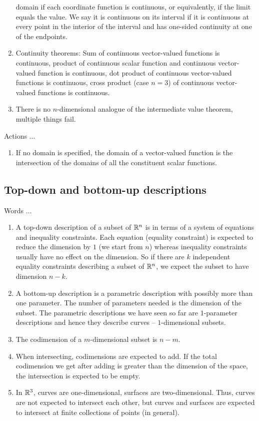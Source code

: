 \documentclass[10pt]{amsart}
\begin{document}
\begin{enumerate}
  domain if each coordinate function is continuous, or equivalently,
  if the limit equals the value. We say it is continuous on its
  interval if it is continuous at every point in the interior of the
  interval and has one-sided continuity at one of the endpoints.
\item Continuity theorems: Sum of continuous vector-valued functions
  is continuous, product of continuous scalar function and continuous
  vector-valued function is continuous, dot product of continuous
  vector-valued functions is continuous, cross product (case $n = 3$)
  of continuous vector-valued functions is continuous.
\item There is no $n$-dimensional analogue of the intermediate value
  theorem, multiple things fail.
\end{enumerate}

Actions ...

\begin{enumerate}
\item If no domain is specified, the domain of a vector-valued
  function is the intersection of the domains of all the constituent
  scalar functions.
\end{enumerate}

\subsection{Top-down and bottom-up descriptions}

Words ...

\begin{enumerate}
\item A top-down description of a subset of $\mathbb{R}^n$ is in terms of a
  system of equations and inequality constraints. Each equation
  (equality constraint) is expected to reduce the dimension by $1$ (we
  start from $n$) whereas inequality constraints usually have no
  effect on the dimension. So if there are $k$ independent equality
  constraints describing a subset of $\mathbb{R}^n$, we expect the subset to
  have dimension $n - k$.
\item A bottom-up description is a parametric description with
  possibly more than one parameter. The number of parameters needed is
  the dimension of the subset. The parametric descriptions we have
  seen so far are $1$-parameter descriptions and hence they describe
  curves -- $1$-dimensional subsets.
\item The codimension of a $m$-dimensional subset is $n - m$.
\item When intersecting, codimensions are expected to add. If the
  total codimension we get after adding is greater than the dimension of
  the space, the intersection is expected to be empty.
\item In $\mathbb{R}^3$, curves are one-dimensional, surfaces are
  two-dimensional. Thus, curves are not expected to intersect each
  other, but curves and surfaces are expected to intersect at finite
  collections of points (in general).
\end{enumerate}
\end{document}
